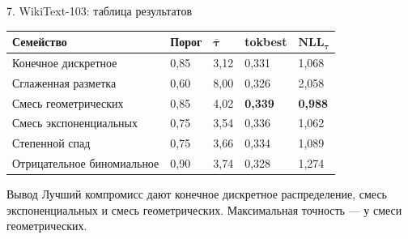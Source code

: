 \documentclass[aspectratio=169,11pt]{beamer}
\begin{document}
\begin{frame}{7. WikiText-103: таблица результатов}
\small
\renewcommand{\arraystretch}{1.18}
\begin{tabularx}{\textwidth}{@{}Y C{14mm} C{15mm} C{16mm} C{15mm}@{}}
\toprule
\textbf{Семейство} & \textbf{Порог} & $\boldsymbol{\bar\tau}$ & \textbf{tokbest} & $\boldsymbol{NLL_\tau}$ \\
\midrule
Конечное дискретное & 0,85 & 3,12 & 0,331 & 1,068 \\
Сглаженная разметка & 0,60 & 8,00 & 0,326 & 2,058 \\
Смесь геометрических & 0,85 & 4,02 & \textbf{0,339} & \textbf{0,988} \\
Смесь экспоненциальных & 0,75 & 3,54 & 0,336 & 1,062 \\
Степенной спад & 0,75 & 3,66 & 0,334 & 1,089 \\
Отрицательное биномиальное & 0,90 & 3,74 & 0,328 & 1,274 \\
\bottomrule
\end{tabularx}

\vspace{3mm}
\begin{block}{Вывод}
Лучший компромисс дают конечное дискретное распределение, смесь экспоненциальных и смесь геометрических. Максимальная точность — у смеси геометрических.
\end{block}
\end{frame}
\end{document}
